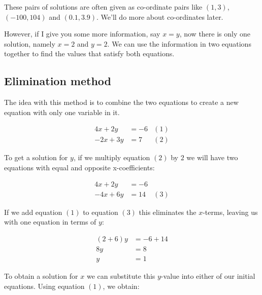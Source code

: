 \documentclass[
  a4paper,
]{scrbook}
\begin{document}
\begin{tcolorbox}[enhanced jigsaw, opacityback=0, left=2mm, toptitle=1mm, title=\textcolor{quarto-callout-tip-color}{\faLightbulb}\hspace{0.5em}{Pro-tip}, breakable, colbacktitle=quarto-callout-tip-color!10!white, opacitybacktitle=0.6, bottomtitle=1mm, arc=.35mm, colback=white, leftrule=.75mm, bottomrule=.15mm, colframe=quarto-callout-tip-color-frame, rightrule=.15mm, titlerule=0mm, toprule=.15mm, coltitle=black]
These pairs of solutions are often given as co-ordinate pairs like
\((1,3)\), \((-100,104)\) and \((0.1,3.9)\). We'll do more about
co-ordinates later.
\end{tcolorbox}

However, if I give you some more information, say \(x = y\), now there
is only one solution, namely \(x = 2\) and \(y=2\). We can use the
information in two equations together to find the values that satisfy
both equations.

\hypertarget{elimination-method}{%
\subsection{Elimination method}\label{elimination-method}}

The idea with this method is to combine the two equations to create a
new equation with only one variable in it.

\[
\begin{aligned}
4x + 2y &= -6 &(1)\\
-2x + 3y &= 7 &(2)
\end{aligned}
\]

To get a solution for \(y\), if we multiply equation \((2)\) by \(2\) we
will have two equations with equal and opposite x-coefficients:

\[
\begin{aligned}
4x + 2y &= -6   \\
-4x + 6y &= 14 &(3)
\end{aligned}
\]

If we add equation \((1)\) to equation \((3)\) this eliminates the
\(x\)-terms, leaving us with one equation in terms of \(y\):

\[
\begin{aligned}
(2+6)y &= -6 + 14   \\
8y &= 8 \\
y &= 1
\end{aligned}
\]

To obtain a solution for \(x\) we can substitute this \(y\)-value into
either of our initial equations. Using equation \((1)\), we obtain:
\end{document}

